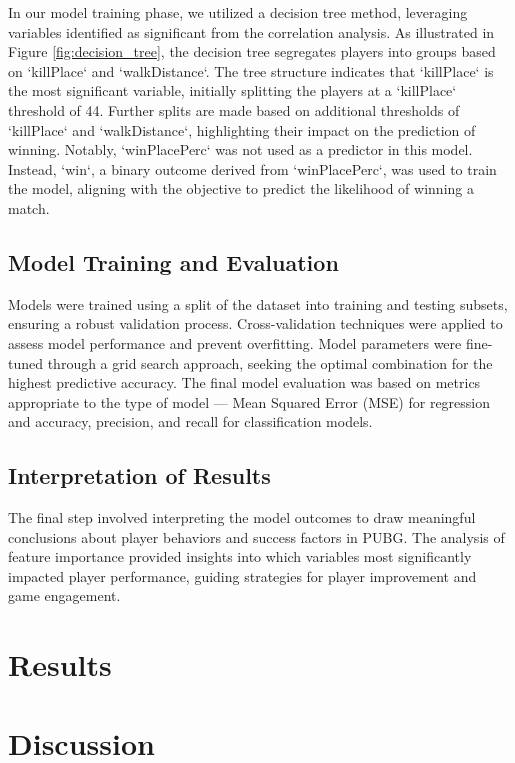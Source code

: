 \documentclass[12pt]{article}
\begin{document}
In our model training phase, we utilized a decision tree method, leveraging variables identified as significant from the correlation analysis. As illustrated in Figure \ref{fig:decision_tree}, the decision tree segregates players into groups based on `killPlace` and `walkDistance`. The tree structure indicates that `killPlace` is the most significant variable, initially splitting the players at a `killPlace` threshold of 44. Further splits are made based on additional thresholds of `killPlace` and `walkDistance`, highlighting their impact on the prediction of winning. Notably, `winPlacePerc` was not used as a predictor in this model. Instead, `win`, a binary outcome derived from `winPlacePerc`, was used to train the model, aligning with the objective to predict the likelihood of winning a match.


\subsection{Model Training and Evaluation}
Models were trained using a split of the dataset into training and testing subsets, ensuring a robust validation process. Cross-validation techniques were applied to assess model performance and prevent overfitting. Model parameters were fine-tuned through a grid search approach, seeking the optimal combination for the highest predictive accuracy. The final model evaluation was based on metrics appropriate to the type of model — Mean Squared Error (MSE) for regression and accuracy, precision, and recall for classification models.


\subsection{Interpretation of Results}
The final step involved interpreting the model outcomes to draw meaningful conclusions about player behaviors and success factors in PUBG. The analysis of feature importance provided insights into which variables most significantly impacted player performance, guiding strategies for player improvement and game engagement.



\section{Results}
\label{sec:resu}







\section{Discussion}
\label{sec:disc}
\end{document}
